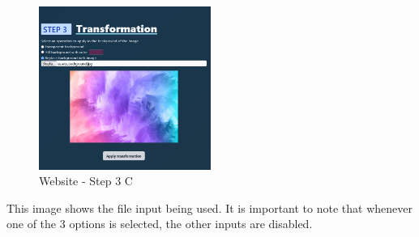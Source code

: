 \documentclass[a4paper]{article}
\begin{document}
\begin{figure}
    \vspace{-\intextsep}
    \includegraphics[width=0.5\textwidth]{website/step3C.png}
    \caption{Website - Step 3 C}
\end{figure}

This image shows the file input being used.
It is important to note that whenever one of the 3
options is selected, the other inputs are disabled.

\wrapfill
\end{document}
